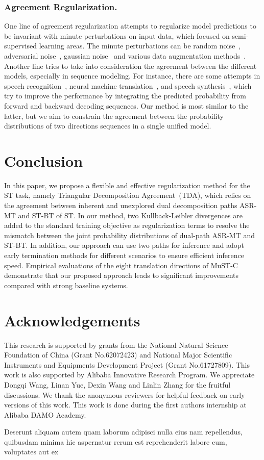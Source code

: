 \documentclass[letterpaper]{article} %
\begin{document}
\subsubsection*{Agreement Regularization.}
One line of agreement regularization attempts to regularize model predictions to be invariant with minute perturbations on input data, which focused on semi-supervised learning areas.
The minute perturbations can be random noise~\cite[]{Zheng2016ImprovingTR}, adversarial noise~\cite[]{Miyato2019VirtualAT,Carmon2019UnlabeledDI,Zhu2020FreeLBEA,Jiang2020SMARTRA}, gaussian noise~\cite[]{Aghajanyan2021BetterFB} and various data augmentation methods~\cite[]{Ye2019UnsupervisedEL,Xie2020UnsupervisedDA}.
Another line tries to take into consideration the agreement between the different models, especially in sequence modeling.
For instance, there are some attempts in speech recognition~\cite{Mimura2018ForwardBackwardAD}, neural machine translation~\cite[]{Liu2016AgreementOT,Zhang2019RegularizingNM}, and speech synthesis~\cite[]{Zheng2019ForwardBackwardDF}, which try to improve the performance by integrating the predicted probability from forward and backward decoding sequences.
Our method is most similar to the latter, but we aim to constrain the agreement between the probability distributions of two directions sequences in a single unified model.

\section{Conclusion}
In this paper, we propose a flexible and effective regularization method for the ST task, namely Triangular Decomposition Agreement~(TDA), which relies on the agreement between inherent and unexplored dual decomposition paths ASR-MT and ST-BT of ST.
In our method, two Kullback-Leibler divergences are added to the standard training objective as regularization terms to resolve the mismatch between the joint probability distributions of dual-path ASR-MT and ST-BT.
In addition, our approach can use two paths for inference and adopt early termination methods for different scenarios to ensure efficient inference speed.
Empirical evaluations of the eight translation directions of MuST-C demonstrate that our proposed approach leads to significant improvements compared with strong baseline systems.

\section*{Acknowledgements}
This research is supported by grants from the National Natural Science Foundation of China (Grant No.62072423) and National Major Scientific Instruments and Equipments Development Project (Grant No.61727809). This work is also supported by Alibaba Innovative Research Program. We appreciate Dongqi Wang, Linan Yue, Dexin Wang and Linlin Zhang for the fruitful discussions. We thank the anonymous reviewers for helpful feedback on early versions of this work. This work is done during the first
authors internship at Alibaba DAMO Academy.

Deserunt aliquam autem quam laborum adipisci nulla eius nam repellendus, quibusdam minima hic aspernatur rerum est reprehenderit labore cum, voluptates aut ex

\end{document}
